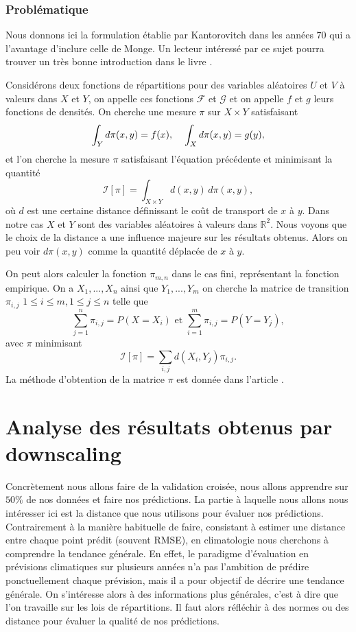 \documentclass[a4paper,10pt]{article}
\begin{document}
\subsubsection{Problématique}

Nous donnons ici la formulation établie par Kantorovitch dans les années $70$ qui a l'avantage d'inclure celle de Monge. Un lecteur intéressé par ce sujet pourra trouver un très bonne introduction dans le livre \cite{villani2003topics}. 

Considérons deux fonctions de répartitions pour des variables aléatoires $U$ et $V$ à valeurs dans $X$ et $Y$, on appelle ces fonctions $\mathcal{F}$ et $\mathcal{G}$ et on appelle $f$ et $g$ leurs fonctions de densités. On cherche une mesure $\pi$ sur  $X \times Y$ satisfaisant
\[\int_{Y} d\pi(x,y)= f(x), \hspace{4mm} \int_{X}  d \pi(x,y)= g(y),\]
et l'on cherche la mesure $\pi$ satisfaisant l'équation précédente et minimisant la quantité
\[\mathcal{I}[\pi]=\int_{X \times Y}d(x,y) \, d\pi(x,y),\]
où $d$ est une certaine distance définissant le coût de transport de $x$ à $y$. Dans notre cas $X$ et $Y$ sont des variables aléatoires à valeurs dans $\mathbb{R}^2$. Nous voyons que le choix de la distance a une influence majeure sur les résultats obtenus. Alors on peu voir $d\pi(x,y)$ comme la quantité déplacée de $x$ à $y$.

On peut alors calculer la fonction $\pi_{m,n}$ dans le cas fini, représentant la fonction empirique. On a $X_1,...,X_n$ ainsi que $Y_1,...,Y_m$ on cherche la matrice de transition $\pi_{i,j}$ $1\leq i \leq m, 1\leq j \leq n$ telle que 
\[\sum_{j=1}^{n} \pi_{i,j}= P(X=X_i) \textrm{ et } \sum_{i=1}^{m} \pi_{i,j}= P(Y=Y_j),\]
avec $\pi$ minimisant 
\[\mathcal{I}[\pi]=\sum_{i,j}d(X_i,Y_j)\pi_{i,j}.\]  
La méthode d'obtention de la matrice $\pi$ est donnée dans l'article \cite{robin2019multivariate}.




\section{Analyse des résultats obtenus par downscaling}
\label{analyse-pred}
Concrètement nous allons faire de la validation croisée, nous allons apprendre sur $50\%$ de nos données et faire nos prédictions. La partie à laquelle nous allons nous intéresser ici est la distance que nous utilisons pour évaluer nos prédictions. Contrairement à la manière habituelle de faire, consistant à estimer une distance entre chaque point prédit (souvent RMSE), en climatologie nous cherchons à comprendre la tendance générale. En effet, le paradigme d'évaluation en prévisions climatiques sur plusieurs années n'a pas l'ambition de prédire ponctuellement chaque prévision, mais il a pour objectif de décrire une tendance générale. On s'intéresse alors à des informations plus générales, c'est à dire que l'on travaille sur les lois de répartitions. Il faut alors réfléchir à des normes ou des distance pour évaluer la qualité de nos prédictions.  
\end{document}
